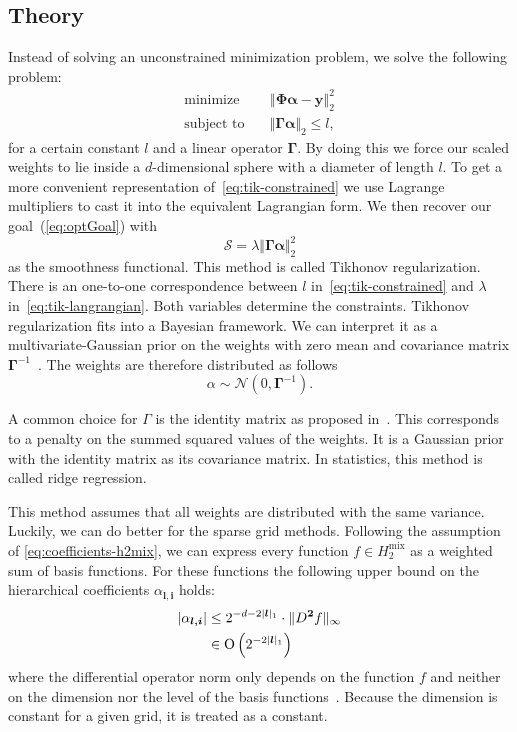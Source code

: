 \subsection{Theory}
Instead of solving an unconstrained minimization problem, we solve the following
problem:
\begin{align}\label{eq:tik-constrained}
 \text{minimize} \quad &
 \left\Vert  \bm{\Phi} \bm{\alpha} - \bm{y}  \right\Vert_2^2 \nonumber \\
\text{subject to} \quad &  \Vert \bm{\Gamma} \bm{\alpha}  \Vert_2 \leq l,
\end{align}
for a certain constant \(l\) and a linear operator \(\bm{\Gamma}\). 
By doing this we force our scaled weights to lie inside a \(d\)-dimensional sphere with a diameter of length \(l\).
To get a more convenient representation of~\cref{eq:tik-constrained} we use Lagrange multipliers to cast it into the equivalent Lagrangian form.
We then recover our goal~(\ref{eq:optGoal}) with
\begin{equation}\label{eq:tik-langrangian}
\mathcal{S} = \lambda \Vert \bm{\Gamma} \bm{\alpha} \Vert_2^2
\end{equation}
as the smoothness functional.
This method is called Tikhonov regularization.
There is an one-to-one correspondence between \(l\) in~\cref{eq:tik-constrained} and \(\lambda\) in~\cref{eq:tik-langrangian}.
Both variables determine the constraints.
Tikhonov regularization fits into a Bayesian framework.
We can interpret it as a multivariate-Gaussian prior on the weights with zero mean and covariance matrix \(\bm{\Gamma}^{-1}\)~\cite{stat-inverse}.
The weights are therefore distributed as follows
\begin{equation*}
\alpha \sim \mathcal{N} (0, \bm{\Gamma}^{-1}).
\end{equation*}

A common choice for \(\Gamma\) is the identity matrix as proposed in~\cite{spatAdaptGrid}.
This corresponds to a penalty on the summed squared values of the weights.
It is a Gaussian prior with the identity matrix as its covariance matrix.
In statistics, this method is called ridge regression.

This method assumes that all weights are distributed with the same variance.
Luckily, we can do better for the sparse grid methods.
Following the assumption of \vref{eq:coefficients-h2mix}, we can express every
function \(f \in H_2^{\text{mix}}\) as a weighted sum of basis functions.
For these functions the following upper bound on the hierarchical coefficients \(\alpha_{\bm{l, i}}\) holds:
\begin{align}\label{eq:weights-bound}
  \vert \alpha_{\bm{l, i}} \vert &\leq 2^{-d -2 \vert \bm{l} \vert_1} \cdot \Vert D^{\bm{2}} f \Vert_{\infty} \\
                              &\in \operatorname{O} \left( 2^{-2 \vert \bm{l} \vert_1} \right)
\end{align}
where the differential operator norm only depends on the function \(f\) and neither on the dimension nor the level of the basis functions~\cite{bungartzSparse}.
Because the dimension is constant for a given grid, it is treated as a constant.

